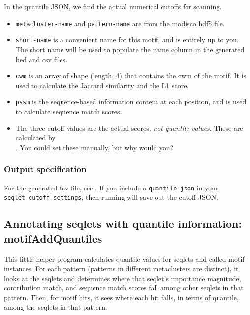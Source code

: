 \documentclass{article}
\begin{document}
In the quantile JSON, we find the actual numerical cutoffs for scanning.

\begin{itemize}
    \item \texttt{metacluster-name} and \texttt{pattern-name} are from the modisco hdf5 file.
    \item \texttt{short-name} is a convenient name for this motif, and is entirely up to you.
        The short name will be used to populate the name column in the generated bed and csv files.
    \item \texttt{cwm} is an array of shape (length, 4) that contains the cwm of the motif.
        It is used to calculate the Jaccard similarity and the L1 score.
    \item \texttt{pssm} is the sequence-based information content at each position, and is
        used to calculate sequence match scores.
    \item The three cutoff values are the actual scores, \emph{not quantile values}.
        These are calculated by \\ . You could set these
        manually, but why would you?
\end{itemize}

\subsubsection{Output specification}
For the generated tsv file, see .
If you include a \texttt{quantile-json} in your \\ \texttt{seqlet-cutoff-settings}, then
running  will save out the cutoff JSON.


\newpage


\subsection{Annotating seqlets with quantile information: {motifAddQuantiles}}\label{prog:motifAddQuantiles}

This little helper program calculates quantile values for seqlets and called motif instances.
For each pattern (patterns in different metaclusters are distinct), it looks at the seqlets
and determines where that seqlet's importance magnitude, contribution match, and sequence match
scores fall among other seqlets in that pattern.
Then, for motif hits, it sees where each hit falls, in terms of quantile, among the seqlets
in that pattern.
\end{document}
